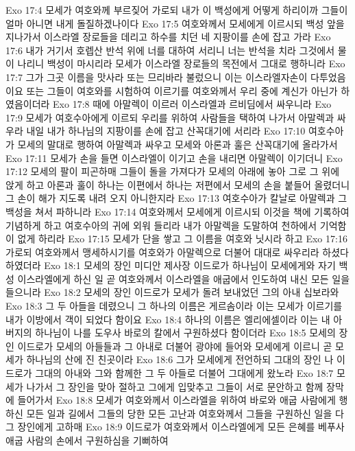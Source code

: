Exo 17:4  모세가 여호와께 부르짖어 가로되 내가 이 백성에게 어떻게 하리이까 그들이 얼마 아니면 내게 돌질하겠나이다
Exo 17:5  여호와께서 모세에게 이르시되 백성 앞을 지나가서 이스라엘 장로들을 데리고 하수를 치던 네 지팡이를 손에 잡고 가라
Exo 17:6  내가 거기서 호렙산 반석 위에 너를 대하여 서리니 너는 반석을 치라 그것에서 물이 나리니 백성이 마시리라 모세가 이스라엘 장로들의 목전에서 그대로 행하니라
Exo 17:7  그가 그곳 이름을 맛사라 또는 므리바라 불렀으니 이는 이스라엘자손이 다투었음이요 또는 그들이 여호와를 시험하여 이르기를 여호와께서 우리 중에 계신가 아닌가 하였음이더라
Exo 17:8  때에 아말렉이 이르러 이스라엘과 르비딤에서 싸우니라
Exo 17:9  모세가 여호수아에게 이르되 우리를 위하여 사람들을 택하여 나가서 아말렉과 싸우라 내일 내가 하나님의 지팡이를 손에 잡고 산꼭대기에 서리라
Exo 17:10  여호수아가 모세의 말대로 행하여 아말렉과 싸우고 모세와 아론과 훌은 산꼭대기에 올라가서
Exo 17:11  모세가 손을 들면 이스라엘이 이기고 손을 내리면 아말렉이 이기더니
Exo 17:12  모세의 팔이 피곤하매 그들이 돌을 가져다가 모세의 아래에 놓아 그로 그 위에 앉게 하고 아론과 훌이 하나는 이편에서 하나는 저편에서 모세의 손을 붙들어 올렸더니 그 손이 해가 지도록 내려 오지 아니한지라
Exo 17:13  여호수아가 칼날로 아말렉과 그 백성을 쳐서 파하니라
Exo 17:14  여호와께서 모세에게 이르시되 이것을 책에 기록하여 기념하게 하고 여호수아의 귀에 외워 들리라 내가 아말렉을 도말하여 천하에서 기억함이 없게 하리라
Exo 17:15  모세가 단을 쌓고 그 이름을 여호와 닛시라 하고
Exo 17:16  가로되 여호와께서 맹세하시기를 여호와가 아말렉으로 더불어 대대로 싸우리라 하셨다 하였더라
Exo 18:1  모세의 장인 미디안 제사장 이드로가 하나님이 모세에게와 자기 백성 이스라엘에게 하신 일 곧 여호와께서 이스라엘을 애굽에서 인도하여 내신 모든 일을 들으니라
Exo 18:2  모세의 장인 이드로가 모세가 돌려 보내었던 그의 아내 십보라와
Exo 18:3  그 두 아들을 데렸으니 그 하나의 이름은 게르솜이라 이는 모세가 이르기를 내가 이방에서 객이 되었다 함이요
Exo 18:4  하나의 이름은 엘리에셀이라 이는 내 아버지의 하나님이 나를 도우사 바로의 칼에서 구원하셨다 함이더라
Exo 18:5  모세의 장인 이드로가 모세의 아들들과 그 아내로 더불어 광야에 들어와 모세에게 이르니 곧 모세가 하나님의 산에 진 친곳이라
Exo 18:6  그가 모세에게 전언하되 그대의 장인 나 이드로가 그대의 아내와 그와 함께한 그 두 아들로 더불어 그대에게 왔노라
Exo 18:7  모세가 나가서 그 장인을 맞아 절하고 그에게 입맞추고 그들이 서로 문안하고 함께 장막에 들어가서
Exo 18:8  모세가 여호와께서 이스라엘을 위하여 바로와 애굽 사람에게 행하신 모든 일과 길에서 그들의 당한 모든 고난과 여호와께서 그들을 구원하신 일을 다 그 장인에게 고하매
Exo 18:9  이드로가 여호와께서 이스라엘에게 모든 은혜를 베푸사 애굽 사람의 손에서 구원하심을 기뻐하여
